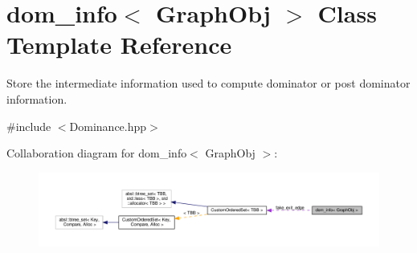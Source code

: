 \hypertarget{classdom__info}{}\section{dom\+\_\+info$<$ Graph\+Obj $>$ Class Template Reference}
\label{classdom__info}


Store the intermediate information used to compute dominator or post dominator information.  




{\ttfamily \#include $<$Dominance.\+hpp$>$}



Collaboration diagram for dom\+\_\+info$<$ Graph\+Obj $>$\+:
\nopagebreak
\begin{figure}[H]
\begin{center}
\leavevmode
\includegraphics[width=350pt]{d7/d16/classdom__info__coll__graph}
\end{center}
\end{figure}
